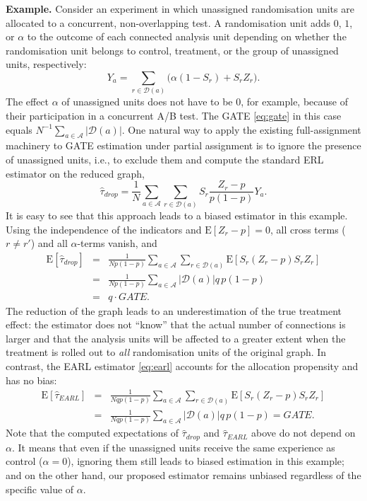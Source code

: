 \documentclass[sigconf]{acmart}
\newcommand{\E}{\mathrm E}
\begin{document}
\medskip
\noindent \textbf{Example.}
Consider an experiment in which unassigned randomisation units are allocated to a concurrent, non-overlapping test. A randomisation unit adds $0$, $1$, or $\alpha$ to the outcome of each connected analysis unit depending on whether the randomisation unit belongs to control, treatment, or the group of unassigned units, respectively:
\begin{equation*}
    Y_a = \sum_{r\in\mathcal D(a)}\bigl(\alpha(1-S_r) + S_rZ_r\bigr).
\end{equation*}
The effect $\alpha$ of unassigned units does not have to be 0, for example, because of their participation in a concurrent A/B test. The GATE \eqref{eq:gate} in this case equals $N^{-1}\sum_{a\in\mathcal{A}}|\mathcal{D}(a)|$.
One natural way to apply the existing full-assignment machinery to GATE estimation under partial assignment is to ignore the presence of unassigned units, i.e., to exclude them and compute the standard ERL estimator \cite{harshaw2023erl} on the reduced graph,
\begin{equation}\label{eq:erl-drop}
    \hat \tau_{drop} = \frac 1 N \sum_{a\in\mathcal{A}}\sum_{r\in\mathcal{D}(a)}S_r\frac{Z_r-p}{p(1-p)}Y_a.
\end{equation}
It is easy to see that this approach leads to a biased estimator in this example. Using the independence of the indicators and $\E[Z_r-p]=0$, all cross terms ($r\neq r'$) and all $\alpha$-terms vanish, and
\begin{eqnarray*}
    \E[\hat\tau_{drop}] &=& \frac {1}{Np(1-p)}\sum_{a\in\mathcal{A}} \sum_{r\in\mathcal{D}(a)}\E\left[S_r(Z_r-p)S_rZ_r  \right]\\
    &=& \frac 1 {Np(1-p)}\sum_{a\in\mathcal{A}}\left|\mathcal{D}(a)\right|q\,p(1-p)\\
    &=&q \cdot GATE.
\end{eqnarray*}
The reduction of the graph leads to an underestimation of the true treatment effect: the estimator does not ``know'' that the actual number of connections is larger and that the analysis units will be affected to a greater extent when the treatment is rolled out to \emph{all} randomisation units of the original graph. In contrast, the EARL estimator \eqref{eq:earl} accounts for the allocation propensity and has no bias:
\begin{eqnarray*}
    \E[\hat\tau_{EARL}] &=& \frac {1}{Nqp(1-p)}\sum_{a\in\mathcal{A}} \sum_{r\in\mathcal{D}(a)}\E\left[S_r(Z_r-p)S_rZ_r  \right]\\
    &=& \frac 1 {Nqp(1-p)}\sum_{a\in\mathcal{A}}\left|\mathcal{D}(a)\right|q\,p(1-p)
    = GATE.
\end{eqnarray*}
Note that the computed expectations of $\hat \tau_{drop}$ and $\hat\tau_{EARL}$ above do not depend on $\alpha$. It means that even if the unassigned units receive the same experience as control ($\alpha=0$), ignoring them still leads to biased estimation in this example; and on the other hand, our proposed estimator remains unbiased regardless of the specific value of $\alpha$.
\end{document}

